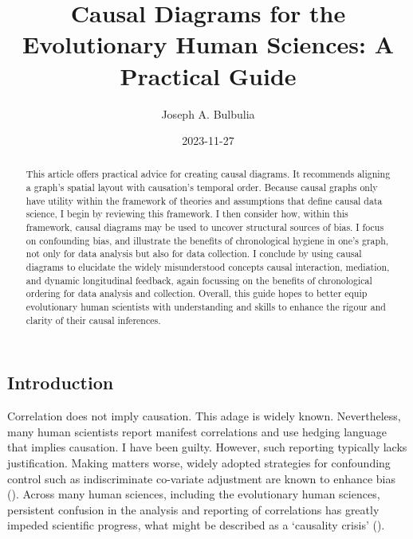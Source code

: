 \documentclass[
  singlecolumn,
  9pt]{article}
\title{Causal Diagrams for the Evolutionary Human Sciences: A Practical
Guide}
\author{Joseph A. Bulbulia}
\affil{%
                  Victoria University of Wellington, New Zealand, School
                  of Psychology, Centre for Applied Cross-Cultural
                  Research
              }
\date{2023-11-27}
\begin{document}
\maketitle
\begin{abstract}
This article offers practical advice for creating causal diagrams. It
recommends aligning a graph's spatial layout with causation's temporal
order. Because causal graphs only have utility within the framework of
theories and assumptions that define causal data science, I begin by
reviewing this framework. I then consider how, within this framework,
causal diagrams may be used to uncover structural sources of bias. I
focus on confounding bias, and illustrate the benefits of chronological
hygiene in one's graph, not only for data analysis but also for data
collection. I conclude by using causal diagrams to elucidate the widely
misunderstood concepts causal interaction, mediation, and dynamic
longitudinal feedback, again focussing on the benefits of chronological
ordering for data analysis and collection. Overall, this guide hopes to
better equip evolutionary human scientists with understanding and skills
to enhance the rigour and clarity of their causal inferences.
\end{abstract}
\subsection{Introduction}\label{introduction}

Correlation does not imply causation. This adage is widely known.
Nevertheless, many human scientists report manifest correlations and use
hedging language that implies causation. I have been guilty. However,
such reporting typically lacks justification. Making matters worse,
widely adopted strategies for confounding control such as indiscriminate
co-variate adjustment are known to enhance bias
(). Across many human
sciences, including the evolutionary human sciences, persistent
confusion in the analysis and reporting of correlations has greatly
impeded scientific progress, what might be described as a `causality
crisis' ().
\end{document}
